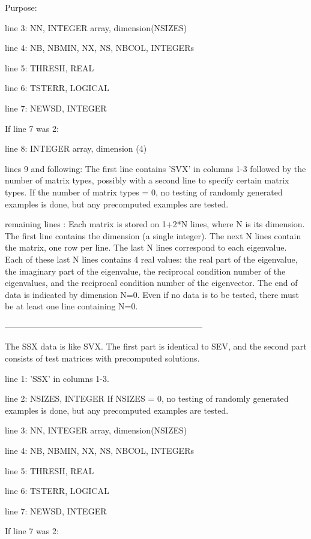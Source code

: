 \begin{DoxyParagraph}{Purpose\+: }
\begin{DoxyVerb}
 line 3:  NN, INTEGER array, dimension(NSIZES)

 line 4:  NB, NBMIN, NX, NS, NBCOL, INTEGERs

 line 5:  THRESH, REAL

 line 6:  TSTERR, LOGICAL

 line 7:  NEWSD, INTEGER

 If line 7 was 2:

 line 8:  INTEGER array, dimension (4)

 lines 9 and following: The first line contains 'SVX' in columns 1-3
          followed by the number of matrix types, possibly with
          a second line to specify certain matrix types.
          If the number of matrix types = 0, no testing of randomly
          generated examples is done, but any precomputed examples
          are tested.

 remaining lines : Each matrix is stored on 1+2*N lines, where N is
          its dimension. The first line contains the dimension (a
          single integer). The next N lines contain the matrix, one
          row per line. The last N lines correspond to each
          eigenvalue. Each of these last N lines contains 4 real
          values: the real part of the eigenvalue, the imaginary
          part of the eigenvalue, the reciprocal condition number of
          the eigenvalues, and the reciprocal condition number of the
          eigenvector.  The end of data is indicated by dimension N=0.
          Even if no data is to be tested, there must be at least one
          line containing N=0.

-----------------------------------------------------------------------

 The SSX data is like SVX. The first part is identical to SEV, and the
 second part consists of test matrices with precomputed solutions.

 line 1:  'SSX' in columns 1-3.

 line 2:  NSIZES, INTEGER
          If NSIZES = 0, no testing of randomly generated examples
          is done, but any precomputed examples are tested.

 line 3:  NN, INTEGER array, dimension(NSIZES)

 line 4:  NB, NBMIN, NX, NS, NBCOL, INTEGERs

 line 5:  THRESH, REAL

 line 6:  TSTERR, LOGICAL

 line 7:  NEWSD, INTEGER

 If line 7 was 2:


\end{DoxyVerb}
\end{DoxyParagraph}
